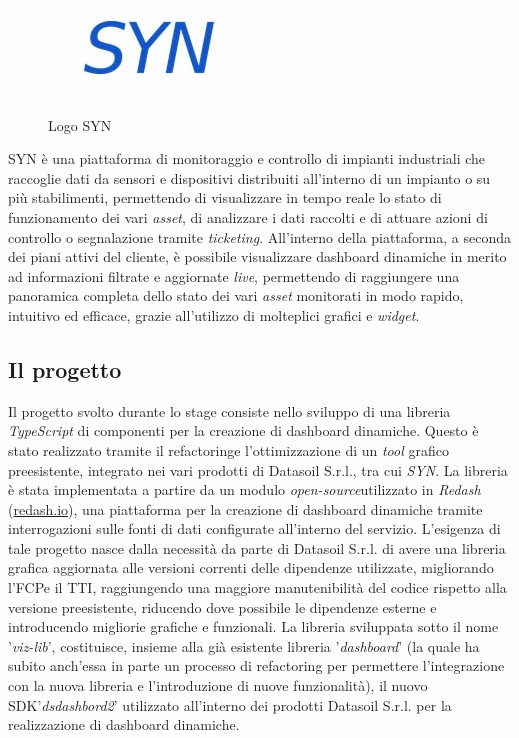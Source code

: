 \begin{figure}[H]
      \centering
      \includegraphics[alt={Logo SYN}, width=0.25\columnwidth]{img/syn_logo.jpg}
      \caption{Logo SYN}
      \label{fig:syn}
\end{figure}

SYN è una piattaforma di monitoraggio e controllo di impianti industriali che raccoglie dati da sensori e dispositivi
distribuiti all'interno di un impianto o su più stabilimenti, permettendo di visualizzare in tempo reale lo stato di
funzionamento dei vari \textit{asset}, di analizzare i dati raccolti e di attuare azioni di controllo o segnalazione tramite
\textit{ticketing}. All'interno della piattaforma, a seconda dei piani attivi del cliente, è possibile visualizzare dashboard dinamiche
in merito ad informazioni filtrate e aggiornate \textit{live}, permettendo di raggiungere una panoramica completa dello stato dei vari
\textit{asset} monitorati in modo rapido, intuitivo ed efficace, grazie all'utilizzo di molteplici grafici e \textit{widget}.

\subsection{Il progetto}
Il progetto svolto durante lo stage consiste nello sviluppo di una libreria \textit{TypeScript} di componenti per la creazione di dashboard dinamiche.
Questo è stato realizzato tramite il \gls{refactoring}\glox e l'ottimizzazione di un \textit{tool} grafico preesistente, integrato nei vari prodotti di Datasoil S.r.l.,
tra cui \textit{SYN}. La libreria è stata implementata a partire da un modulo \textit{\gls{open-source}}\glox utilizzato in \textit{Redash} (\href{https://redash.io}{redash.io}),
una piattaforma per la creazione di dashboard dinamiche tramite interrogazioni sulle fonti di dati configurate all'interno del servizio. \newline
L'esigenza di tale progetto nasce dalla necessità da parte di Datasoil S.r.l. di avere una libreria grafica aggiornata alle versioni
correnti delle dipendenze utilizzate, migliorando l'\gls{FCP}\glox e il \gls{TTI}\glox, raggiungendo una maggiore manutenibilità del codice rispetto alla versione
preesistente, riducendo dove possibile le dipendenze esterne e introducendo migliorie grafiche e funzionali. \newline
La libreria sviluppata sotto il nome '\textit{viz-lib}', costituisce, insieme alla già esistente libreria '\textit{dashboard}' (la quale ha subito anch'essa in parte un processo di refactoring
per permettere l'integrazione con la nuova libreria e l'introduzione di nuove funzionalità), il nuovo \gls{SDK}\glox '\textit{dsdashbord2}'
utilizzato all'interno dei prodotti Datasoil S.r.l. per la realizzazione di dashboard dinamiche.

